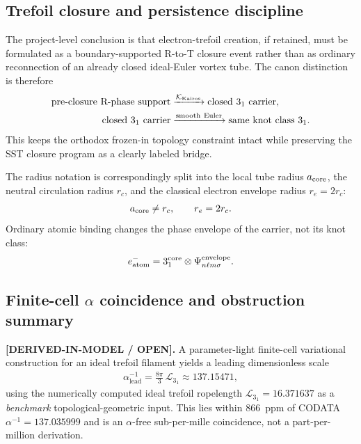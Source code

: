 \documentclass[11pt]{article}
\theoremstyle{definition}
\theoremstyle{plain}
\theoremstyle{remark}
\newcommand{\rc}{{r_c}}
\begin{document}
        \subsection{Trefoil closure and persistence discipline}
            The project-level conclusion is that electron-trefoil creation, if
            retained, must be formulated as a boundary-supported R-to-T closure
            event rather than as ordinary reconnection of an already closed
            ideal-Euler vortex tube. The canon distinction is therefore
            \begin{align}
                \text{pre-closure R-phase support}
                &\xrightarrow{\mathcal{K}_{\rm Kairos}}
                \text{closed }3_1\text{ carrier},\\
                \text{closed }3_1\text{ carrier}
                &\xrightarrow{\rm smooth\ Euler}
                \text{same knot class }3_1 .
            \end{align}
            This keeps the orthodox frozen-in topology constraint intact while
            preserving the SST closure program as a clearly labeled bridge.

            The radius notation is correspondingly split into the local tube
            radius \(a_{\rm core}\), the neutral circulation radius \(\rc\), and
            the classical electron envelope radius \(r_e=2\rc\):
            \begin{align}
                a_{\rm core} \neq \rc,
                \qquad
                r_e=2\rc .
            \end{align}
            Ordinary atomic binding changes the phase envelope of the carrier,
            not its knot class:
            \begin{align}
                e^-_{\rm atom}
                =
                3_1^{\rm core}\otimes\Psi_{n\ell m\sigma}^{\rm envelope} .
            \end{align}


        \subsection{Finite-cell $\alpha$ coincidence and obstruction summary}
            \label{subsec:finite_cell_alpha_obstruction}

            \textbf{[DERIVED-IN-MODEL / OPEN].}
            A parameter-light finite-cell variational construction for an ideal trefoil filament
            yields a leading dimensionless scale
            \begin{align}
                \alpha^{-1}_{\mathrm{lead}}
                =
                \frac{8\pi}{3}\,\mathcal{L}_{3_1}
                \approx 137.15471,
                \label{eq:alpha_lead_finite_cell}
            \end{align}
            using the numerically computed ideal trefoil ropelength
            $\mathcal{L}_{3_1}=16.371637$ as a \emph{benchmark} topological-geometric input.
            This lies within $866$~ppm of CODATA $\alpha^{-1}=137.035999$ and is an
            $\alpha$-free sub-per-mille coincidence, not a part-per-million derivation.
\end{document}
